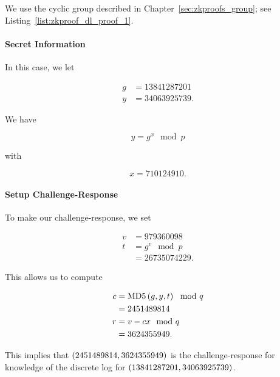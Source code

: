 \begin{example}

We use the \gls{cyclic group} described in Chapter~\ref{sec:zkproofs_group};
see Listing~\ref{list:zkproof_dl_proof_1}.

\paragraph{Secret Information}
In this case, we let

\begin{align}
    g &= 13841287201 \nonumber\\
    y &= 34063925739.
\end{align}

\noindent
We have

\begin{equation}
    y = g^{x} \mod p
\end{equation}

\noindent
with

\begin{equation}
    x = 710124910.
\end{equation}

\paragraph{Setup Challenge-Response}
To make our challenge-response, we set

\begin{align}
    v &= 979360098 \nonumber\\
    t &= g^{v} \mod p \nonumber\\
        &= 26735074229.
\end{align}

\noindent
This allows us to compute

\begin{align}
    c &= \text{MD5{}}\left( g,y,t \right) \mod q \nonumber\\
        &= 2451489814 \nonumber\\
    r &= v - cx \mod q \nonumber\\
        &= 3624355949.
\end{align}

\noindent
This implies that $\left( 2451489814,3624355949 \right)$
is the challenge-response for knowledge of the \gls{discrete log} for
$\left( 13841287201,34063925739 \right)$.


\end{example}
